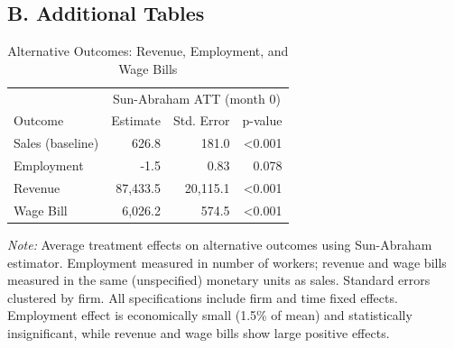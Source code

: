 \documentclass{article}
\begin{document}
\clearpage

\subsection*{B. Additional Tables}

\begin{table}[H]
\centering
\caption{Alternative Outcomes: Revenue, Employment, and Wage Bills}
\label{tab:alt_outcomes}
\begin{tabular}{lrrr}
\toprule
& \multicolumn{3}{c}{Sun-Abraham ATT (month 0)} \\
\cmidrule(lr){2-4}
Outcome & Estimate & Std. Error & p-value \\
\midrule
Sales (baseline) & 626.8 & 181.0 & <0.001 \\
Employment & -1.5 & 0.83 & 0.078 \\
Revenue & 87,433.5 & 20,115.1 & <0.001 \\
Wage Bill & 6,026.2 & 574.5 & <0.001 \\
\bottomrule
\end{tabular}
\begin{tablenotes}[flushleft]
\small
\item \textit{Note:} Average treatment effects on alternative outcomes using Sun-Abraham estimator. Employment measured in number of workers; revenue and wage bills measured in the same (unspecified) monetary units as sales. Standard errors clustered by firm. All specifications include firm and time fixed effects. Employment effect is economically small (1.5\% of mean) and statistically insignificant, while revenue and wage bills show large positive effects.
\end{tablenotes}
\end{table}
\end{document}
